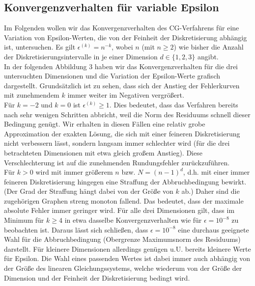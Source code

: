 \documentclass{scrartcl}
\begin{document}
\subsection{Konvergenzverhalten für variable Epsilon}
Im Folgenden wollen wir das Konvergenzverhalten des CG-Verfahrens für eine Variation von Epsilon-Werten, die von der Feinheit der Diskretisierung abhängig ist, untersuchen.
Es gilt $\epsilon^{(k)}=n^{-k}$, wobei $n$ (mit $n \geq 2$) wie bisher die Anzahl der Diskretisierungsintervalle in je einer Dimension $d\in\{1, 2, 3\}$ angibt. \\
In der folgenden Abbildung 3 haben wir das Konvergenzverhalten für die drei untersuchten Dimensionen und die Variation der Epsilon-Werte grafisch dargestellt.
Grundsätzlich ist zu sehen, dass sich der Anstieg der Fehlerkurven mit zunehmendem $k$ immer weiter im Negativen vergrößert. \\
Für $k=-2$ und $k=0$ ist $\epsilon^{(k)}\geq 1$.
Dies bedeutet, dass das Verfahren bereits nach sehr wenigen Schritten abbricht, weil die Norm des Residuums schnell dieser Bedingung genügt.
Wir erhalten in diesen Fällen eine relativ grobe Approximation der exakten Lösung, die sich mit einer feineren Diskretisierung nicht verbessern lässt, sondern langsam immer schlechter wird (für die drei betrachteten Dimensionen mit etwa gleich großem Anstieg).
Diese Verschlechterung ist auf die zunehmenden Rundungsfehler zurückzuführen. \\
Für $k>0$ wird mit immer größerem $n$ bzw. $N=(n-1)^d$, d.h. mit einer immer feineren Diskretisierung hingegen eine Straffung der Abbruchbedingung bewirkt.
(Der Grad der Straffung hängt dabei von der Größe von $k$ ab.)
Daher sind die zugehörigen Graphen streng monoton fallend.
Das bedeutet, dass der maximale absolute Fehler immer geringer wird.
Für alle drei Dimensionen gilt, dass im Minimum für $k\geq4$ in etwa dasselbe Konvergenzverhalten wie für $\epsilon = 10^{-8}$ zu beobachten ist.
Daraus lässt sich schließen, dass $\epsilon = 10^{-8}$ eine durchaus geeignete Wahl für die Abbruchbedingung (Obergrenze Maximumsnorm des Residuums) darstellt.
Für kleinere Dimensionen allerdings genügen u.U. bereits kleinere Werte für Epsilon.
Die Wahl eines passenden Wertes ist dabei immer auch abhängig von der Größe des linearen Gleichungssystems, welche wiederum von der Größe der Dimension und der Feinheit der Diskretisierung bedingt wird. \\
\end{document}

